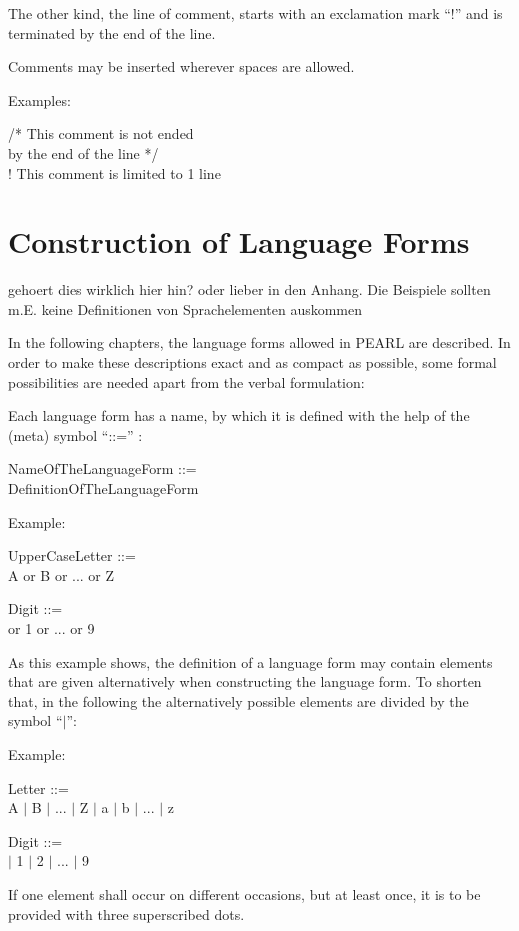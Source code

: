 The other kind, the line of comment, starts with an exclamation
mark ``!'' and is terminated by the end of the line.

Comments may be inserted wherever spaces are allowed.

Examples:

/* This comment is not ended\\
\x by the end of the line */\\
! This comment is limited to 1 line

\section{Construction of Language Forms}  %

\begin{discuss}
gehoert dies wirklich hier hin?
oder lieber in den Anhang. Die Beispiele sollten m.E. keine  Definitionen
von Sprachelementen auskommen
\end{discuss}
In the following chapters, the language forms allowed in PEARL are
described.  In order to make these descriptions exact and as compact as
possible, some formal possibilities are needed apart from the verbal
formulation:

Each language form has a name, by which it is defined with the help of
the (meta) symbol ``::='' :

NameOfTheLanguageForm ::=\\
\x DefinitionOfTheLanguageForm

Example:

UpperCaseLetter ::=\\
\x A or B or ... or Z

Digit ::=\\
 or 1 or ... or 9

As this example shows, the definition of a language form may contain
elements that are given alternatively when constructing the language
form. To shorten that, in the following the alternatively possible
elements are divided by the symbol ``$\mid$'':

Example:

Letter ::=\\
\x A $\mid$ B $\mid$ ... $\mid$ Z $\mid$ a $\mid$ b $\mid$ ... $\mid$ z

Digit ::=\\
 $\mid$ 1 $\mid$ 2 $\mid$ ... $\mid$ 9

If one element shall occur on different occasions, but at least once, it
is to be provided with three superscribed dots.

